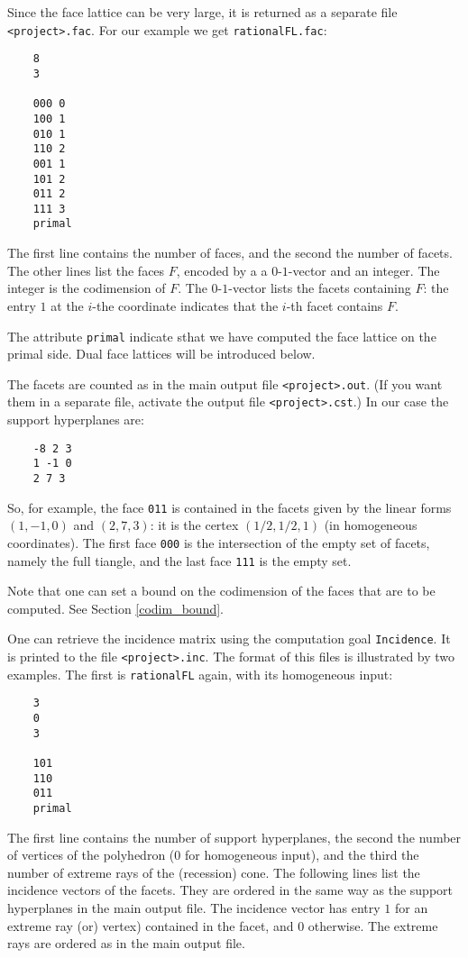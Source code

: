 \documentclass[12pt,a4paper]{scrartcl}
\theoremstyle{definition}
\begin{document}
{	Since the face lattice can be very large, it is returned as a separate file \verb|<project>.fac|. For our example we get \verb|rationalFL.fac|:
	\begin{Verbatim}
	8
	3
	
	000 0
	100 1
	010 1
	110 2
	001 1
	101 2
	011 2
	111 3
	primal
	\end{Verbatim}
	The first line contains the number of faces, and the second the number of facets. The other lines list the faces $F$, encoded by a a $0$-$1$-vector and an integer. The integer is the codimension of $F$.  The $0$-$1$-vector lists the facets containing $F$: the entry $1$ at the $i$-the coordinate indicates that the $i$-th facet contains $F$.
	
	The attribute \verb|primal| indicate sthat we have computed the face lattice on the primal side. Dual face lattices will be introduced below.
	
	The facets are counted as in the main output file \verb|<project>.out|.  (If you want them in a separate file, activate the output file \verb|<project>.cst|.) In our case the support hyperplanes are:
	\begin{Verbatim}
	-8 2 3 
	1 -1 0 
	2 7 3
	\end{Verbatim}
	So, for example, the face \verb|011| is contained in the facets  given by the linear forms $(1,-1,0)$ and 
	$(2, 7,3)$: it is the certex $(1/2,1/2,1)$ (in homogeneous coordinates). The first face \verb|000| is the intersection of the empty set of facets, namely the full tiangle, and the last face \verb|111| is the empty set.
	
	Note that one can set a bound on the codimension of the faces that are to be computed. See Section \ref{codim_bound}.
	
	One can retrieve the incidence matrix using the computation goal \verb|Incidence|. It is printed to the file \verb|<project>.inc|. The format of this files is illustrated by two examples. The first is \verb|rationalFL| again, with its homogeneous input:
	\begin{Verbatim}
	3
	0
	3
	
	101
	110
	011
	primal
	\end{Verbatim}
	The first line contains the number of support hyperplanes, the second the number of vertices of the polyhedron ($0$ for homogeneous input), and the third the number of extreme rays of the (recession) cone. The following lines list the incidence vectors of the facets. They are ordered in the same way as the support hyperplanes in the main output file. The incidence vector has entry $1$ for an extreme ray (or) vertex) contained in the facet, and $0$ otherwise. The extreme rays are ordered as in the main output file.
	
}
\end{document}
